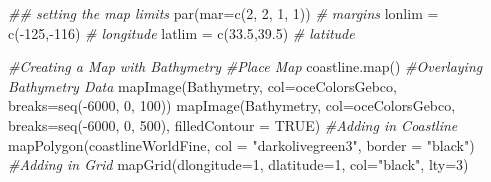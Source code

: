 \documentclass[]{tufte-handout}
\newenvironment{Shaded}{}{}
\newcommand{\AttributeTok}[1]{\textcolor[rgb]{0.49,0.56,0.16}{#1}}
\newcommand{\CommentTok}[1]{\textcolor[rgb]{0.38,0.63,0.69}{\textit{#1}}}
\newcommand{\ConstantTok}[1]{\textcolor[rgb]{0.53,0.00,0.00}{#1}}
\newcommand{\DecValTok}[1]{\textcolor[rgb]{0.25,0.63,0.44}{#1}}
\newcommand{\DocumentationTok}[1]{\textcolor[rgb]{0.73,0.13,0.13}{\textit{#1}}}
\newcommand{\FloatTok}[1]{\textcolor[rgb]{0.25,0.63,0.44}{#1}}
\newcommand{\FunctionTok}[1]{\textcolor[rgb]{0.02,0.16,0.49}{#1}}
\newcommand{\NormalTok}[1]{#1}
\newcommand{\OtherTok}[1]{\textcolor[rgb]{0.00,0.44,0.13}{#1}}
\newcommand{\SpecialCharTok}[1]{\textcolor[rgb]{0.25,0.44,0.63}{#1}}
\newcommand{\StringTok}[1]{\textcolor[rgb]{0.25,0.44,0.63}{#1}}
\begin{document}
\begin{Shaded}
\begin{Highlighting}[]
\DocumentationTok{\#\# setting the map limits}
\FunctionTok{par}\NormalTok{(}\AttributeTok{mar=}\FunctionTok{c}\NormalTok{(}\DecValTok{2}\NormalTok{, }\DecValTok{2}\NormalTok{, }\DecValTok{1}\NormalTok{, }\DecValTok{1}\NormalTok{)) }\CommentTok{\# margins}
\NormalTok{lonlim }\OtherTok{=} \FunctionTok{c}\NormalTok{(}\SpecialCharTok{{-}}\DecValTok{125}\NormalTok{,}\SpecialCharTok{{-}}\DecValTok{116}\NormalTok{) }\CommentTok{\# longitude}
\NormalTok{latlim }\OtherTok{=} \FunctionTok{c}\NormalTok{(}\FloatTok{33.5}\NormalTok{,}\FloatTok{39.5}\NormalTok{) }\CommentTok{\# latitude}

\CommentTok{\#Creating a Map with Bathymetry}
\CommentTok{\#Place Map}
\FunctionTok{coastline.map}\NormalTok{()}
\CommentTok{\#Overlaying Bathymetry Data}
\FunctionTok{mapImage}\NormalTok{(Bathymetry, }\AttributeTok{col=}\NormalTok{oceColorsGebco, }\AttributeTok{breaks=}\FunctionTok{seq}\NormalTok{(}\SpecialCharTok{{-}}\DecValTok{6000}\NormalTok{, }\DecValTok{0}\NormalTok{, }\DecValTok{100}\NormalTok{))}
\FunctionTok{mapImage}\NormalTok{(Bathymetry, }\AttributeTok{col=}\NormalTok{oceColorsGebco, }\AttributeTok{breaks=}\FunctionTok{seq}\NormalTok{(}\SpecialCharTok{{-}}\DecValTok{6000}\NormalTok{, }\DecValTok{0}\NormalTok{, }\DecValTok{500}\NormalTok{), }\AttributeTok{filledContour =} \ConstantTok{TRUE}\NormalTok{)}
\CommentTok{\#Adding in Coastline}
\FunctionTok{mapPolygon}\NormalTok{(coastlineWorldFine, }\AttributeTok{col =} \StringTok{"darkolivegreen3"}\NormalTok{, }\AttributeTok{border =} \StringTok{"black"}\NormalTok{) }
\CommentTok{\#Adding in Grid}
\FunctionTok{mapGrid}\NormalTok{(}\AttributeTok{dlongitude=}\DecValTok{1}\NormalTok{, }\AttributeTok{dlatitude=}\DecValTok{1}\NormalTok{, }\AttributeTok{col=}\StringTok{"black"}\NormalTok{, }\AttributeTok{lty=}\DecValTok{3}\NormalTok{) }


\end{Highlighting}
\end{Shaded}
\end{document}
